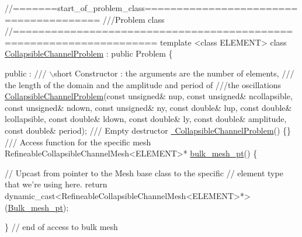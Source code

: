  
\begin{DoxyCodeInclude}
\textcolor{comment}{//=======start\_of\_problem\_class=======================================}
\textcolor{comment}{///Problem class}
\textcolor{comment}{}\textcolor{comment}{//====================================================================}
\textcolor{keyword}{template} <\textcolor{keyword}{class} ELEMENT>
\textcolor{keyword}{class }\hyperlink{classCollapsibleChannelProblem}{CollapsibleChannelProblem} : \textcolor{keyword}{public} Problem
\{

 public :
\textcolor{comment}{}
\textcolor{comment}{ /// \(\backslash\)short Constructor : the arguments are the number of elements,}
\textcolor{comment}{ /// the length of the domain and the amplitude and period of }
\textcolor{comment}{ ///the oscillations}
\textcolor{comment}{} \hyperlink{classCollapsibleChannelProblem_ab43fa30667f57e8019c8b30fd93156f8}{CollapsibleChannelProblem}(\textcolor{keyword}{const} \textcolor{keywordtype}{unsigned}& nup, 
                           \textcolor{keyword}{const} \textcolor{keywordtype}{unsigned}& ncollapsible,
                           \textcolor{keyword}{const} \textcolor{keywordtype}{unsigned}& ndown,
                           \textcolor{keyword}{const} \textcolor{keywordtype}{unsigned}& ny,
                           \textcolor{keyword}{const} \textcolor{keywordtype}{double}& lup,
                           \textcolor{keyword}{const} \textcolor{keywordtype}{double}& lcollapsible, 
                           \textcolor{keyword}{const} \textcolor{keywordtype}{double}& ldown,
                           \textcolor{keyword}{const} \textcolor{keywordtype}{double}& ly,
                           \textcolor{keyword}{const} \textcolor{keywordtype}{double}& amplitude,
                           \textcolor{keyword}{const} \textcolor{keywordtype}{double}& period);
 \textcolor{comment}{}
\textcolor{comment}{ /// Empty destructor}
\textcolor{comment}{} \hyperlink{classCollapsibleChannelProblem_a205e3e654d3205d1d55ac46e7b63ca9d}{~CollapsibleChannelProblem}() \{\} 
 \textcolor{comment}{}
\textcolor{comment}{ /// Access function for the specific mesh}
\textcolor{comment}{} RefineableCollapsibleChannelMesh<ELEMENT>* \hyperlink{classCollapsibleChannelProblem_a49a428b5f489d11b3fb92199b72f6dd7}{bulk\_mesh\_pt}() 
  \{

   \textcolor{comment}{// Upcast from pointer to the Mesh base class to the specific }
   \textcolor{comment}{// element type that we're using here.}
   \textcolor{keywordflow}{return} \textcolor{keyword}{dynamic\_cast<}RefineableCollapsibleChannelMesh<ELEMENT>*\textcolor{keyword}{>}
    (\hyperlink{classCollapsibleChannelProblem_acd96e5a1d72cc3a1aad196c97dcb3883}{Bulk\_mesh\_pt});

  \} \textcolor{comment}{// end of access to bulk mesh}

\end{DoxyCodeInclude}


